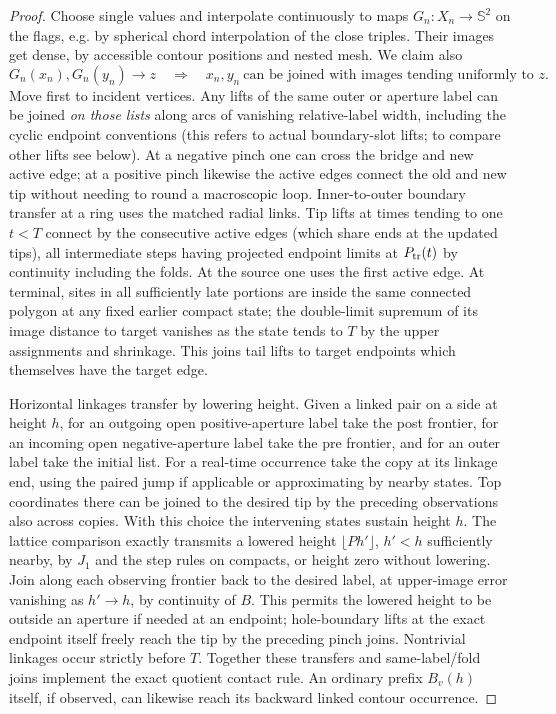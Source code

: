 \begin{proof}
Choose single values and interpolate continuously to maps \(G_n:X_n\to{\mathbb S}^2\) on the flags, e.g. by spherical chord interpolation of the close triples. Their images get dense, by accessible contour positions and nested mesh. We claim also
\begin{equation}\label{eq:original-13}
G_n(x_n),G_n(y_n)\longrightarrow z\quad\Longrightarrow\quad
 x_n,y_n\ \text{can be joined with images tending uniformly to }z .
\end{equation}
Move first to incident vertices.
Any lifts of the same outer or aperture label can be joined \emph{on those lists} along arcs of vanishing relative-label width, including the cyclic endpoint conventions (this refers to actual boundary-slot lifts; to compare other lifts see below).
At a negative pinch one can cross the bridge and new active edge; at a positive pinch likewise the active edges connect the old and new tip without needing to round a macroscopic loop.
Inner-to-outer boundary transfer at a ring uses the matched radial links.
Tip lifts at times tending to one \(t<T\) connect by the consecutive active edges (which share ends at the updated tips), all intermediate steps having projected endpoint limits at \(P_{\rm tr}(t)\) by continuity including the folds.
At the source one uses the first active edge.
At terminal, sites in all sufficiently late portions are inside the same connected polygon at any fixed earlier compact state; the double-limit supremum of its image distance to target vanishes as the state tends to \(T\) by the upper assignments and shrinkage.
This joins tail lifts to target endpoints which themselves have the target edge.

Horizontal linkages transfer by lowering height.
Given a linked pair on a side at height \(h\), for an outgoing open positive-aperture label take the post frontier, for an incoming open negative-aperture label take the pre frontier, and for an outer label take the initial list.
For a real-time occurrence take the copy at its linkage end, using the paired jump if applicable or approximating by nearby states.
Top coordinates there can be joined to the desired tip by the preceding observations also across copies.
With this choice the intervening states sustain height \(h\).
The lattice comparison exactly transmits a lowered height \(\lfloor P h'\rfloor\), \(h'<h\) sufficiently nearby, by \(J_1\) and the step rules on compacts, or height zero without lowering.
Join along each observing frontier back to the desired label, at upper-image error vanishing as \(h'\to h\), by continuity of \(B\).
This permits the lowered height to be outside an aperture if needed at an endpoint; hole-boundary lifts at the exact endpoint itself freely reach the tip by the preceding pinch joins.
Nontrivial linkages occur strictly before \(T\).
Together these transfers and same-label/fold joins implement the exact quotient contact rule.
An ordinary prefix \(B_v(h)\) itself, if observed, can likewise reach its backward linked contour occurrence.


\end{proof}
